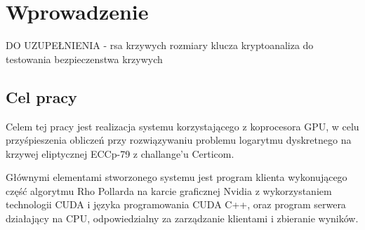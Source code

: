 \newpage
\section{Wprowadzenie}
DO UZUPEŁNIENIA - rsa krzywych rozmiary klucza kryptoanaliza do testowania bezpieczenstwa krzywych
\subsection{Cel pracy}
Celem tej pracy jest realizacja systemu korzystającego z koprocesora GPU,
w celu przyśpieszenia obliczeń przy
rozwiązywaniu problemu logarytmu dyskretnego na krzywej eliptycznej ECCp-79 z challange'u Certicom.
\par
Głównymi elementami stworzonego systemu
jest program klienta wykonującego część algorytmu Rho Pollarda na karcie graficznej Nvidia
z wykorzystaniem technologii CUDA i języka programowania CUDA C++,
oraz program serwera działający na CPU, odpowiedzialny za zarządzanie klientami i zbieranie wyników.
